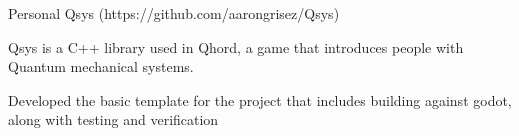 \begin{cventries}
\cventry
    {Personal}
    {Qsys ({\tiny https://github.com/aarongrisez/Qsys})}
    {}
    {}
    {
     \begin{cvitems} %
        \item {Qsys is a C++ library used in Qhord, a game that introduces people with Quantum mechanical systems.}
        \item{Developed the basic template for the project that includes building against godot, along with testing and verification}
      \end{cvitems}
    }

\end{cventries}


